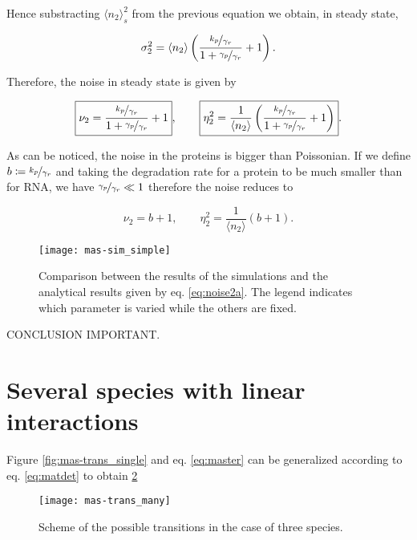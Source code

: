 Hence substracting $\langle n_2\rangle_s^2$ from the previous equation we obtain, in steady state,

\begin{equation}
\sigma_2^2 = \langle n_2\rangle\left(\frac{\nicefrac{k_p}{\gamma_r}}{1+\nicefrac{\gamma_p}{\gamma_r}}+1\right).
\end{equation}

Therefore, the noise in steady state is given by

\begin{equation}
\label{noise2}
\boxed{\nu_2 = \frac{\nicefrac{k_p}{\gamma_r}}{1+\nicefrac{\gamma_p}{\gamma_r}}+1}, \quad \quad \boxed{\eta_2^2 = \frac{1}{\langle n_2\rangle}\left(\frac{\nicefrac{k_p}{\gamma_r}}{1+\nicefrac{\gamma_p}{\gamma_r}}+1\right)}.
\end{equation}

As can be noticed, the noise in the proteins is bigger than Poissonian. If we define $b\coloneqq \nicefrac{k_p}{\gamma_r}$ and taking the degradation rate for a protein to be much smaller than for RNA, we have $\nicefrac{\gamma_p}{\gamma_r} \ll 1$ therefore the noise reduces to

\begin{equation}
\label{eq:noise2a}
\boxed{\nu_2 = b+1}, \quad \quad \boxed{\eta_2^2 = \frac{1}{\langle n_2\rangle}\left(b+1\right)}.
\end{equation}

\begin{figure}[H]
  \centering
  \texttt{[image: mas-sim\_simple]}
  \caption[Noise in proteins: comparing analytical results and simulations]{\label{fig:mas-sim_simple} Comparison between the results of the simulations and the analytical results given by eq. \ref{eq:noise2a}. The legend indicates which parameter is varied while the others are fixed.}
\end{figure}

CONCLUSION IMPORTANT.

\section{Several species with linear interactions}

Figure \ref{fig:mas-trans_single} and eq. \ref{eq:master} can be generalized according to eq. \ref{eq:matdet} to obtain \ref{fig:mas-trans_many}

\begin{figure}[H]
  \centering
  \texttt{[image: mas-trans\_many]}
  \caption[Transitions between states in general] {\label{fig:mas-trans_many} Scheme of the possible transitions in the case of three species.}
\end{figure}

